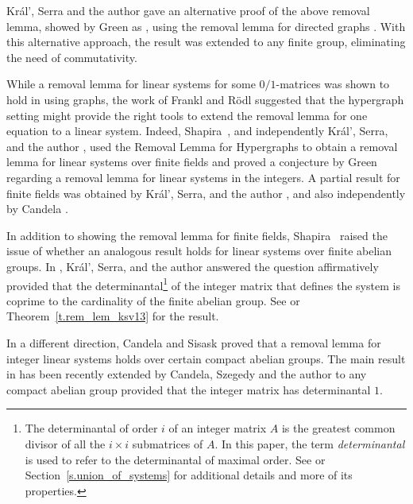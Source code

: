 \documentclass[10pt]{article}
\begin{document}
Kr\'al', Serra and the author \cite{kraserven09} gave an alternative proof of the above removal lemma, showed by Green as \cite[Theorem~1.5]{gre05}, using the removal lemma for directed graphs \cite{alosha04}. With this alternative approach, the result was extended to any finite group, eliminating the need of commutativity.
 

While a removal lemma for linear systems for some $0/1$-matrices was shown to hold in \cite{kraserven09} using graphs, the work of Frankl and R\"odl \cite{frarod02} suggested that the hypergraph setting might provide the right tools to extend the removal lemma for one equation to a linear system.
Indeed,  Shapira~\cite{sha10}, and independently Kr\'al', Serra, and the author \cite{kraserven12}, used the Removal Lemma for Hypergraphs to obtain a removal lemma for linear systems over finite fields and proved a conjecture by Green \cite[Conjecture~9.4]{gre05} regarding a removal lemma for linear systems in the integers. 
A partial result for finite fields was obtained by Kr\'al', Serra, and the author \cite{kraserven08}, and also independently by Candela \cite{can_tesis_09}.



In addition to showing the removal lemma for finite fields,
Shapira~\cite{sha10} raised the issue of whether an analogous result holds for linear systems over finite abelian groups. In \cite{ksv13}, %
 Kr\'al', Serra, and the author answered the question affirmatively provided that the determinantal\footnote{The determinantal of order $i$ of an integer matrix $A$ is the greatest common divisor of all the $i\times i$ submatrices of $A$. In this paper, the term \emph{determinantal} is used to refer to the determinantal of maximal order. See 
\cite[Chapter~II, Section~13]{new72} or 
Section~\ref{s.union_of_systems} for additional details and more of its properties.} of the integer matrix that defines the system is coprime to the cardinality of the finite abelian group. See \cite[Theorem~1]{ksv13} or Theorem~\ref{t.rem_lem_ksv13} for the result.



In a different direction, Candela and Sisask \cite{cansis13} proved that a removal lemma for integer linear systems holds over certain compact abelian groups. 
The main result in \cite{cansis13} has been recently extended by Candela, Szegedy and the author \cite{canszeven14+} to any compact abelian group provided that the integer matrix has determinantal $1$.
\end{document}
